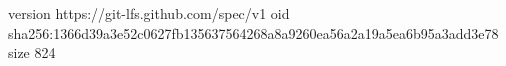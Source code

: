 version https://git-lfs.github.com/spec/v1
oid sha256:1366d39a3e52c0627fb135637564268a8a9260ea56a2a19a5ea6b95a3add3e78
size 824
